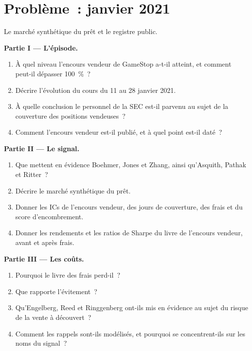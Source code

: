 \section{Problème~: janvier 2021}

\begin{problem}\label{pb:s1:short-interest-borrow-and-crowding:1}
Le marché synthétique du prêt et le registre public.

\medskip\noindent\textbf{Partie I --- L'épisode.}
\begin{enumerate}
\item À quel niveau l'encours vendeur de GameStop a-t-il atteint, et comment peut-il dépasser 100~\%~?
\item Décrire l'évolution du cours du 11 au 28 janvier 2021.
\item À quelle conclusion le personnel de la SEC est-il parvenu au sujet de la couverture des positions vendeuses~?
\item Comment l'encours vendeur est-il publié, et à quel point est-il daté~?
\end{enumerate}

\medskip\noindent\textbf{Partie II --- Le signal.}
\begin{enumerate}[resume]
\item Que mettent en évidence Boehmer, Jones et Zhang, ainsi qu'Asquith, Pathak et Ritter~?
\item Décrire le marché synthétique du prêt.
\item Donner les ICs de l'encours vendeur, des jours de couverture, des frais et du score d'encombrement.
\item Donner les rendements et les ratios de Sharpe du livre de l'encours vendeur, avant et après frais.
\end{enumerate}

\medskip\noindent\textbf{Partie III --- Les coûts.}
\begin{enumerate}[resume]
\item Pourquoi le livre des frais perd-il~?
\item Que rapporte l'évitement~?
\item Qu'Engelberg, Reed et Ringgenberg ont-ils mis en évidence au sujet du risque de la vente à découvert~?
\item Comment les rappels sont-ils modélisés, et pourquoi se concentrent-ils sur les noms du signal~?
\end{enumerate}


\end{problem}

